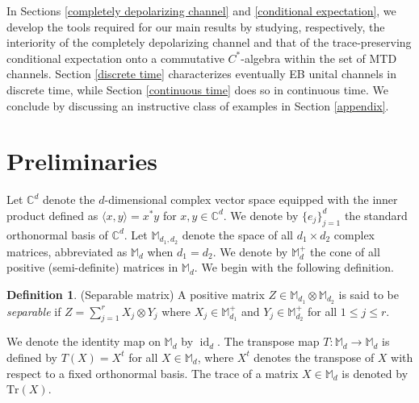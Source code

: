 \documentclass[11pt,reqno]{amsart}
\theoremstyle{definition}
\newtheorem{defn}{Definition}[section]
\theoremstyle{plain}
\theoremstyle{remark}
\numberwithin{equation}{section}%
\begin{document}
In Sections \ref{completely depolarizing channel} and \ref{conditional expectation}, we develop the tools required for our main results by studying, respectively, the interiority of the completely depolarizing channel and that of the trace-preserving conditional expectation onto a commutative $C^*$-algebra within the set of MTD channels. Section \ref{discrete time} characterizes eventually EB unital channels in discrete time, while Section \ref{continuous time} does so in continuous time. We conclude by discussing an instructive class of examples in Section \ref{appendix}.








\section{Preliminaries}\label{priliminaries}


Let $\mathbb{C}^d$ denote the $d$-dimensional complex vector space equipped with the inner product defined as $\langle x,y\rangle=x^*y$ for $x,y\in\mathbb{C}^d$. We denote by $\{e_j\}_{j=1}^d$ the standard orthonormal basis of $\mathbb{C}^d$. Let $\mathbb{M}_{d_1,d_2}$ denote the space of all $d_1 \times d_2$ complex matrices, abbreviated as $\mathbb{M}_d$ when $d_1=d_2$. We denote by $\mathbb{M}_d^+$ the cone of all positive (semi-definite) matrices in $\mathbb{M}_d$. We begin with the following definition.



\begin{defn}(Separable matrix)
	A positive matrix $Z\in\mathbb{M}_{d_1}\otimes\mathbb{M}_{d_2}$ is said to be \textit{separable} if $Z=\sum_{j=1}^r X_j\otimes Y_j$ where $X_j\in\mathbb{M}_{d_1}^+$ and $Y_j\in\mathbb{M}_{d_2}^+$ for all $1\leq j\leq r$.
\end{defn}


We denote the identity map on $\mathbb{M}_d$ by $\operatorname{id}_d$. The transpose map $T:\mathbb{M}_d\rightarrow\mathbb{M}_d$ is defined by $T(X)=X^t$ for all $X\in\mathbb{M}_d$, where $X^t$ denotes the transpose of $X$ with respect to a fixed orthonormal basis. The trace of a matrix $X\in\mathbb{M}_d$ is denoted by $\text{Tr}(X)$.
\end{document}
